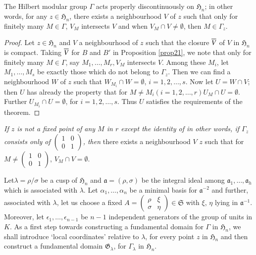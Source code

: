 \begin{thm}\label{thm16}
The Hilbert modular group $\Gamma$ acts properly discontinuously on
$\mathfrak{H}_{n}$; in other words, for any $z\in\mathfrak{H}_{n}$,
there exists a neighbourhood $V$ of $z$ such that only for finitely
many $M\in\Gamma$, $V_{M}$ intersects $V$ and when $V_{M}\cap V\neq
\emptyset$, then $M\in\Gamma_{z}$.
\end{thm}

\begin{proof}
Let $z\in\mathfrak{H}_{n}$ and $V$ a neighbourhood of $z$ such that
the closure $\overline{V}$ of $V$ in $\mathfrak{H}_{n}$ is compact. Taking
$\overline{V}$ for $B$ and $B'$ in Proposition \ref{prop21}, we note that
only for finitely many $M\in\Gamma$, say $M_{1},\ldots,M_{r},V_{M}$
intersects $V$. Among these $M_{i}$, let $M_{1},\ldots,M_{s}$ be
exactly those which do not belong to $\Gamma_{z}$. Then we can find a
neighbourhood $W$ of $z$ such that $W_{M_{i}}\cap W=\emptyset$,
$i=1,2,\ldots,s$. Now let $U=W\cap V$; then $U$ has already the
property that for $M\neq M_{i}(i=1,2,\ldots,r)U_{M}\cap
U=\emptyset$. Further $U_{M_{i}}\cap U=\emptyset$, for
$i=1,2,\ldots,s$. Thus $U$ satisfies the requirements of the theorem.
\end{proof}

{\em If $z$ is not a fixed point of any $M$ in $r$ except the identity
  of in other words, if $\Gamma_{z}$ consists only of
  $\left(\begin{smallmatrix} 1 & 0\\ 0 & 1
  \end{smallmatrix}\right)$, then} there exists a neighbourhood $V$ $z$
  such that for $M\neq \left(\begin{smallmatrix} 1 & 0\\ 0 & 1
  \end{smallmatrix}\right)$, $V_{M}\cap V=\emptyset$.

Let\pageoriginale $\lambda=\rho/\sigma$ be a cusp of
$\mathfrak{H}_{n}$ and $\mathfrak{a}=(\rho,\sigma)$ be the integral
ideal among $\mathfrak{a}_{1},\ldots,\mathfrak{a}_{h}$ which is
associated with $\lambda$. Let $\alpha_{1},\ldots,\alpha_{n}$ be a
minimal basis for $\mathfrak{a}^{-2}$ and further, associated with
$\lambda$, let us choose a fixed $A=\left(\begin{smallmatrix} \rho &
  \xi\\ \sigma & \eta\end{smallmatrix}\right)\in \mathfrak{S}$ with
  $\xi$, $\eta$ lying in $\mathfrak{a}^{-1}$. Moreover, let
  $\epsilon_{1},\ldots,\epsilon_{n-1}$ be $n-1$ independent generators
  of the group of units in $K$. As a first step towards constructing a
  fundamental domain for $\Gamma$ in $\mathfrak{H}_{n}$, we shall
  introduce `local coordinates' relative to $\lambda$, for every point
  $z$ in $\mathfrak{H}_{n}$ and then construct a fundamental domain
  $\mathfrak{G}_{\lambda}$, for $\Gamma_{\lambda}$ in
  $\mathfrak{H}_{n}$.

